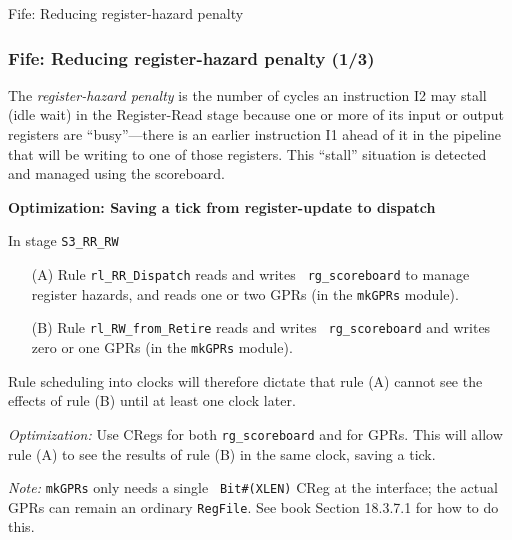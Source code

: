 \begin{frame}

\begin{center}
  {\LARGE Fife: Reducing register-hazard penalty}
\end{center}

\end{frame}


\begin{frame}[fragile]
\frametitle{Fife: Reducing register-hazard penalty (1/3)}

\footnotesize

The \emph{register-hazard penalty} is the number of cycles an
instruction I2 may stall (idle wait) in the Register-Read stage
because one or more of its input or output registers are
``busy''---there is an earlier instruction I1 ahead of it in the
pipeline that will be writing to one of those registers.  This
``stall'' situation is detected and managed using the scoreboard.

\PAUSE{\vxxxx}

\hdivider

{\bf Optimization: Saving a tick from register-update to dispatch}

\vx

In stage {\tt S3\_RR\_RW}
\begin{itemize}

  \item[(A)] Rule {\tt rl\_RR\_Dispatch} reads and writes {\tt
      rg\_scoreboard} to manage register hazards, and reads one or two
      GPRs (in the {\tt mkGPRs} module).

  \item[(B)] Rule {\tt rl\_RW\_from\_Retire} reads and writes {\tt
      rg\_scoreboard} and writes zero or one GPRs (in the {\tt mkGPRs}
      module).

\end{itemize}

\vxx

Rule scheduling into clocks will therefore dictate that rule (A)
cannot see the effects of rule (B) until at least one clock later.

\vxx

{\emph{Optimization:}} Use CRegs for both {\tt rg\_scoreboard} and for
GPRs.  This will allow rule (A) to see the results of rule (B) in the
same clock, saving a tick.

\PAUSE{\vxx}

{\scriptsize\emph{Note:} {\tt mkGPRs} only needs a single {\tt
Bit\#(XLEN)} CReg at the interface; the actual GPRs can remain an
ordinary {\tt RegFile}.  See book Section 18.3.7.1 for how to do
this.}

\end{frame}


